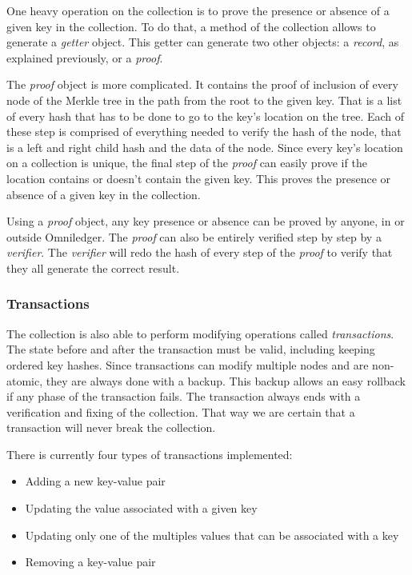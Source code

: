 \documentclass[11pt, a4paper, twoside, openright]{article}
\begin{document}
One heavy operation on the collection is to prove the presence or absence of a given key in the collection. To do that, a method of the collection allows to generate a \textit{getter} object. This getter can generate two other objects: a \textit{record}, as explained previously, or a \textit{proof}.

The \textit{proof} object is more complicated. It contains the proof of inclusion of every node of the Merkle tree in the path from the root to the given key. That is a list of every hash that has to be done to go to the key's location on the tree. Each of these step is comprised of everything needed to verify the hash of the node, that is a left and right child hash and the data of the node. Since every key's location on a collection is unique, the final step of the \textit{proof} can easily prove if the location contains or doesn't contain the given key. This proves the presence or absence of a given key in the collection.

Using a \textit{proof} object, any key presence or absence can be proved by anyone, in or outside Omniledger. The \textit{proof} can also be entirely verified step by step by a \textit{verifier}. The \textit{verifier} will redo the hash of every step of the \textit{proof} to verify that they all generate the correct result.

\subsubsection{Transactions}
\label{transactions}
The collection is also able to perform modifying operations called \textit{transactions}. The state before and after the transaction must be valid, including keeping ordered key hashes. Since transactions can modify multiple nodes and are non-atomic, they are always done with a backup. This backup allows an easy rollback if any phase of the transaction fails. The transaction always ends with a verification and fixing of the collection. That way we are certain that a transaction will never break the collection.

There is currently four types of transactions implemented:
\begin{itemize}
\itemsep0em
\item Adding a new key-value pair
\item Updating the value associated with a given key
\item Updating only one of the multiples values that can be associated with a key
\item Removing a key-value pair
\end{itemize}
\end{document}
